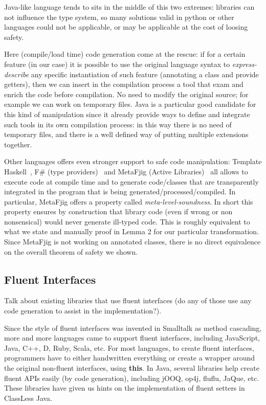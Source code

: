 Java-like language tends to sits in the middle of this two extremes:
libraries can not influence the type system, so many solutions valid in python or other languages could not be applicable, or may be applicable at the cost of loosing safety.

Here (compile/load time) code generation come at the rescue: 
if for a certain feature (\mixin in our case) it is possible to use the original language syntax to
\emph{express-describe} any specific instantiation of such feature
(annotating a class and provide getters), then we can insert in the compilation process a tool that exam and enrich the code before compilation. No need to modify the original source; for example we can work on temporary files.
Java is a particular good candidate for this kind of manipulation since it already provide ways to define and integrate such tools in its own compilation process: in this way there is no need of temporary files, and there is a well defined way of putting multiple extensions together.

Other languages offers even stronger support to safe code manipulation:
Template Haskell~\cite{}, F\# (type providers)~\cite{} and MetaFjig (Active Libraries)~\cite{}
all allows to execute code at compile time and to generate code/classes that are transparently integrated in the program that is being generated/processed/compiled.
In particular, MetaFjig offers a property called \emph{meta-level-soundness}. In short this property ensures by construction that library code (even if wrong or non nonsensical) would never generate ill-typed code. This is roughly equivalent to what we state and manually proof in Lemma 2 for our particular transformation.
Since MetaFjig is not working on annotated classes, there is no direct equivalence on the overall theorem of safety we shown.

\subsection{Fluent Interfaces}
Talk about existing libraries that use fluent interfaces (do any of
those use any code generation to assist in the implementation?).

Since the style of fluent interfaces was invented in Smalltalk as method
cascading, more and more languages came to support fluent interfaces, including
JavaScript, Java, C++, D, Ruby, Scala, etc. For most languages, to create fluent
interfaces, programmers have to either handwritten everything or create a
wrapper around the original non-fluent interfaces, using \textbf{this}. In Java,
several libraries help create fluent APIs easily (by code generation), including
jOOQ, op4j, fluflu, JaQue, etc. These libraries have given us hints on the
implementation of fluent setters in ClassLess Java.

